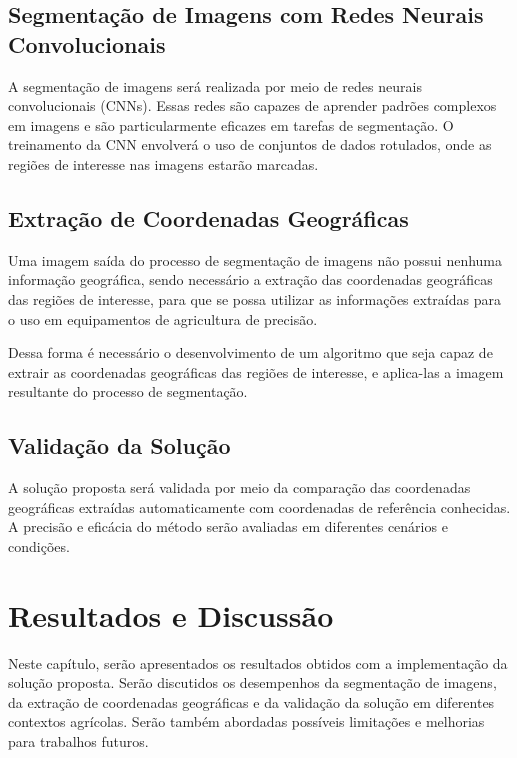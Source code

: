 \documentclass[conference]{IEEEtran}
\begin{document}
\subsection{Segmentação de Imagens com Redes Neurais Convolucionais}
A segmentação de imagens será realizada por meio de redes neurais convolucionais (CNNs). 
Essas redes são capazes de aprender padrões complexos em imagens e são particularmente eficazes 
em tarefas de segmentação. O treinamento da CNN envolverá o uso de conjuntos de dados rotulados, 
onde as regiões de interesse nas imagens estarão marcadas.

\subsection{Extração de Coordenadas Geográficas}
Uma imagem saída do processo de segmentação de imagens não possui nenhuma informação geográfica, sendo necessário a extração
das coordenadas geográficas das regiões de interesse, para que se possa utilizar as informações extraídas para o uso em
equipamentos de agricultura de precisão.

Dessa forma é necessário o desenvolvimento de um algoritmo que seja capaz de extrair as coordenadas geográficas das regiões
de interesse, e aplica-las a imagem resultante do processo de segmentação.


\subsection{Validação da Solução}
A solução proposta será validada por meio da comparação das coordenadas geográficas extraídas 
automaticamente com coordenadas de referência conhecidas. A precisão e eficácia do método serão 
avaliadas em diferentes cenários e condições.

\section{Resultados e Discussão}
Neste capítulo, serão apresentados os resultados obtidos com a implementação da solução proposta. 
Serão discutidos os desempenhos da segmentação de imagens, da extração de coordenadas 
geográficas e da validação da solução em diferentes contextos agrícolas. 
Serão também abordadas possíveis limitações e melhorias para trabalhos futuros.
\end{document}
